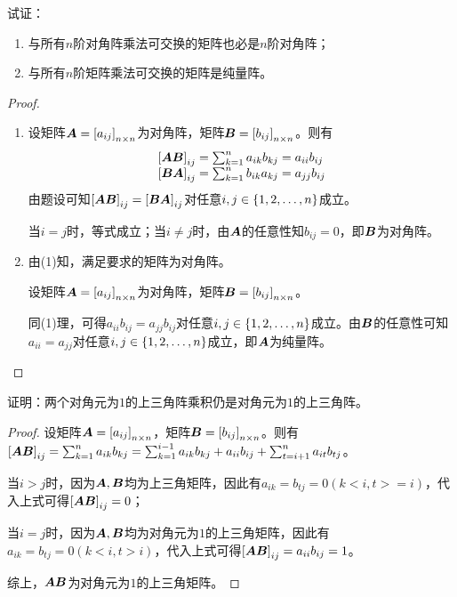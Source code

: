 \begin{problem}
试证：
\begin{enumerate}
    \item 与所有\(n\)阶对角阵乘法可交换的矩阵也必是\(n\)阶对角阵；
    \item 与所有\(n\)阶矩阵乘法可交换的矩阵是纯量阵。
\end{enumerate}
\end{problem}
\begin{proof}
    \begin{enumerate}
        \item
              {
              设矩阵\(\boldsymbol{A}=\left[ a_{ij} \right]_{n\times n}\)为对角阵，矩阵\(\boldsymbol{B}=\left[ b_{ij} \right]_{n\times n}\)。则有
              \begin{equation*}
                  \begin{array}{lll}
                      \left[ \boldsymbol{A}\boldsymbol{B} \right]_{ij}=\sum_{k=1}^na_{ik}b_{kj}=a_{ii}b_{ij} \\
                      \left[ \boldsymbol{B}\boldsymbol{A} \right]_{ij}=\sum_{k=1}^nb_{ik}a_{kj}=a_{jj}b_{ij}
                  \end{array}
              \end{equation*}
              由题设可知\(\left[ \boldsymbol{A}\boldsymbol{B} \right]_{ij}=\left[ \boldsymbol{B}\boldsymbol{A} \right]_{ij}\)对任意\(i,j\in\left\{1,2,\dots,n \right\}\)成立。

              当\(i=j\)时，等式成立；当\(i\neq j\)时，由\(\boldsymbol{A}\)的任意性知\(b_{ij}=0\)，即\(\boldsymbol{B}\)为对角阵。
              }
        \item
              {
              由(1)知，满足要求的矩阵为对角阵。

              设矩阵\(\boldsymbol{A}=\left[ a_{ij} \right]_{n\times n}\)为对角阵，矩阵\(\boldsymbol{B}=\left[ b_{ij} \right]_{n\times n}\)。

              同(1)理，可得\(a_{ii}b_{ij}=a_{jj}b_{ij}\)对任意\(i,j\in\left\{1,2,\dots,n \right\}\)成立。由\(\boldsymbol{B}\)的任意性可知\(a_{ii}=a_{jj}\)对任意\(i,j\in\left\{1,2,\dots,n \right\}\)成立，即\(\boldsymbol{A}\)为纯量阵。
              }
    \end{enumerate}
\end{proof}

\begin{problem}
证明：两个对角元为\(1\)的上三角阵乘积仍是对角元为\(1\)的上三角阵。
\end{problem}
\begin{proof}
    设矩阵\(\boldsymbol{A}=\left[ a_{ij} \right]_{n\times n}\)，矩阵\(\boldsymbol{B}=\left[ b_{ij} \right]_{n\times n}\)。则有\(\left[ \boldsymbol{A}\boldsymbol{B} \right]_{ij}=\sum_{k=1}^na_{ik}b_{kj}=\sum_{k=1}^{i-1}a_{ik}b_{kj}+a_{ii}b_{ij}+\sum_{t=i+1}^na_{it}b_{tj}\)。

    当\(i>j\)时，因为\(\boldsymbol{A},\boldsymbol{B}\)均为上三角矩阵，因此有\(a_{ik}=b_{tj}=0(k<i,t>=i)\)，代入上式可得\(\left[ \boldsymbol{A}\boldsymbol{B} \right]_{ij}=0\)；

    当\(i=j\)时，因为\(\boldsymbol{A},\boldsymbol{B}\)均为对角元为\(1\)的上三角矩阵，因此有\(a_{ik}=b_{tj}=0(k<i,t>i)\)，代入上式可得\(\left[ \boldsymbol{A}\boldsymbol{B} \right]_{ij}=a_{ii}b_{ij}=1\)。

    综上，\(\boldsymbol{A}\boldsymbol{B}\)为对角元为\(1\)的上三角矩阵。
\end{proof}


